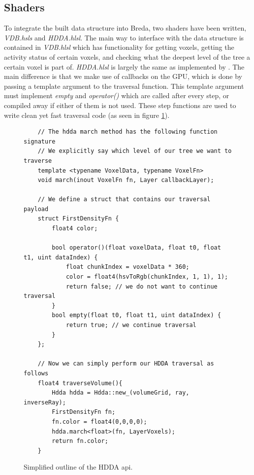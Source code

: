 \subsection{Shaders} \label{implementation:shaders}
To integrate the built data structure into Breda, two shaders have been written, \textit{VDB.hsls} and \textit{HDDA.hlsl}. The main way to interface with the data structure is contained in \textit{VDB.hlsl} which has functionality for getting voxels, getting the activity status of certain voxels, and checking what the deepest level of the tree a certain voxel is part of. \textit{HDDA.hlsl} is largely the same as implemented by \cite{museth2013vdb}. The main difference is that we make use of callbacks on the GPU, which is done by passing a template argument to the traversal function. This template argument must implement \textit{empty} and \textit{operator()} which are called after every step, or compiled away if either of them is not used. These step functions are used to write clean yet fast traversal code (as seen in figure \ref{implementation:hdda_sample}).


\begin{figure}
    \begin{lstlisting}
    // The hdda march method has the following function signature
    // We explicitly say which level of our tree we want to traverse
    template <typename VoxelData, typename VoxelFn>
    void march(inout VoxelFn fn, Layer callbackLayer);

    // We define a struct that contains our traversal payload
    struct FirstDensityFn {
        float4 color;
    
        bool operator()(float voxelData, float t0, float t1, uint dataIndex) {
            float chunkIndex = voxelData * 360;
            color = float4(hsvToRgb(chunkIndex, 1, 1), 1);
            return false; // we do not want to continue traversal
        }
        bool empty(float t0, float t1, uint dataIndex) { 
            return true; // we continue traversal
        }
    };

    // Now we can simply perform our HDDA traversal as follows
    float4 traverseVolume(){
        Hdda hdda = Hdda::new_(volumeGrid, ray, inverseRay);
        FirstDensityFn fn;
        fn.color = float4(0,0,0,0);
        hdda.march<float>(fn, LayerVoxels); 
        return fn.color;
    }
\end{lstlisting}
    \caption{Simplified outline of the HDDA api.}\label{implementation:hdda_sample}
\end{figure}


